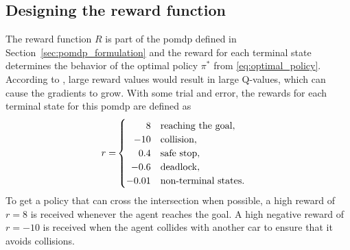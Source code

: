 \subsection{Designing the reward function}
The reward function $R$ is part of the \gls{pomdp} defined in Section~\ref{sec:pomdp_formulation} and the reward for each terminal state determines the behavior of the optimal policy $\pi^*$ from \eqref{eq:optimal_policy}. 
According to \cite{Hasselt2016}, large reward values would result in large Q-values, which can cause the gradients to grow. With some trial and error, the rewards for each terminal state for this \gls{pomdp} are defined as
\begin{align*}
r = & \begin{cases}
\hfill 8 & \text{reaching the goal},\\
\hfill -10 & \text{collision},\\
\hfill 0.4 & \text{safe stop},\\
\hfill -0.6 & \text{deadlock}, \\
-0.01 & \text{non-terminal states}.
\label{eq:reward_values}
\end{cases} 
\end{align*}
To get a policy that can cross the intersection when possible, a high reward of $r=8$ is received whenever the agent reaches the goal. A high negative reward of $r=-10$ is received when the agent collides with another car to ensure that it avoids collisions. 

